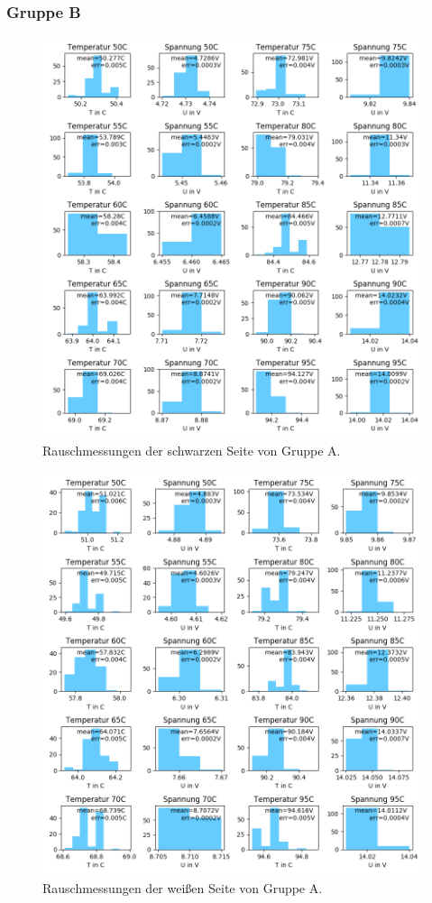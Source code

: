 \documentclass[12pt,a4paper]{article}
\begin{document}
\subsubsection{Gruppe B}

\begin{figure}[H]
\includegraphics[scale=0.8]{Bilder/Rauschen_B_schwarz_2.png}
\caption{Rauschmessungen der schwarzen Seite von Gruppe A.}
\end{figure}

\begin{figure}[H]
\includegraphics[scale=0.8]{Bilder/Rauschen_B_weiss_2.png}
\caption{Rauschmessungen der weißen Seite von Gruppe A.}
\end{figure}
\end{document}

